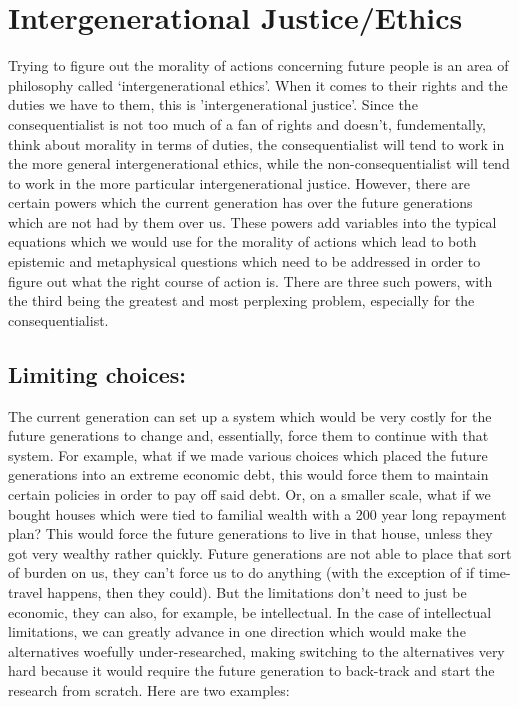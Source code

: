 \section{Intergenerational Justice/Ethics}

Trying to figure out the morality of actions concerning future people is an area of philosophy called ‘intergenerational ethics’. When it comes to their rights and the duties we have to them, this is 'intergenerational justice'. Since the consequentialist is not too much of a fan of rights and doesn't, fundementally, think about morality in terms of duties, the consequentialist will tend to work in the more general intergenerational ethics, while the non-consequentialist will tend to work in the more particular intergenerational justice. However, there are certain powers which the current generation has over the future generations which are not had by them over us. These powers add variables into the typical equations which we would use for the morality of actions which lead to both epistemic and metaphysical questions which need to be addressed in order to figure out what the right course of action is. There are three such powers, with the third being the greatest and most perplexing problem, especially for the consequentialist.

\subsection{Limiting choices:}

The current generation can set up a system which would be very costly for the future generations to change and, essentially, force them to continue with that system. For example, what if we made various choices which placed the future generations into an extreme economic debt, this would force them to maintain certain policies in order to pay off said debt. Or, on a smaller scale, what if we bought houses which were tied to familial wealth with a 200 year long repayment plan? This would force the future generations to live in that house, unless they got very wealthy rather quickly. Future generations are not able to place that sort of burden on us, they can't force us to do anything (with the exception of if time-travel happens, then they could). But the limitations don't need to just be economic, they can also, for example, be intellectual. In the case of intellectual limitations, we can greatly advance in one direction which would make the alternatives woefully under-researched, making switching to the alternatives very hard because it would require the future generation to back-track and start the research from scratch. Here are two examples: 

